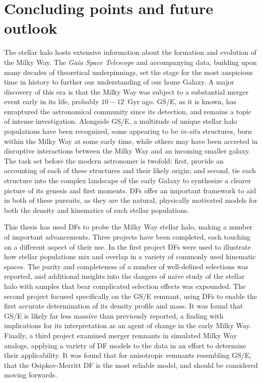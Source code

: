 \section{Concluding points and future outlook}

The stellar halo hosts extensive information about the formation and evolution of the Milky Way. The \textit{Gaia Space Telescope} and accompanying data, building upon many decades of theoretical underpinnings, set the stage for the most auspicious time in history to further our understanding of our home Galaxy. A major discovery of this era is that the Milky Way was subject to a substantial merger event early in its life, probably $10-12$~Gyr ago. GS/E, as it is known, has enraptured the astronomical community since its detection, and remains a topic of intense investigation. Alongside GS/E, a multitude of unique stellar halo populations have been recognized, some appearing to be \textit{in-situ} structures, born within the Milky Way at some early time, while others may have been accreted in disruptive interactions between the Milky Way and an incoming smaller galaxy. The task set before the modern astronomer is twofold: first, provide an accounting of each of these structures and their likely origin; and second, tie each structure into the complex landscape of the early Galaxy to synthesize a clearer picture of its genesis and first moments. DFs offer an important framework to aid in both of these pursuits, as they are the natural, physically motivated models for both the density and kinematics of such stellar populations.

This thesis has used DFs to probe the Milky Way stellar halo, making a number of important advancements. Three projects have been completed, each touching on a different aspect of their use. In the first project DFs were used to illustrate how stellar populations mix and overlap in a variety of commonly used kinematic spaces. The purity and completeness of a number of well-defined selections was reported, and additional insights into the dangers of naive study of the stellar halo with samples that bear complicated selection effects was expounded. The second project focused specifically on the GS/E remnant, using DFs to enable the first accurate determination of its density profile and mass. It was found that GS/E is likely far less massive than previously reported, a finding with implications for its interpretation as an agent of change in the early Milky Way. Finally, a third project examined merger remnants in simulated Milky Way analogs, applying a variety of DF models to the data in an effort to determine their applicability. It was found that for anisotropic remnants resembling GS/E, that the Osipkov-Merritt DF is the most reliable model, and should be considered moving forwards.


